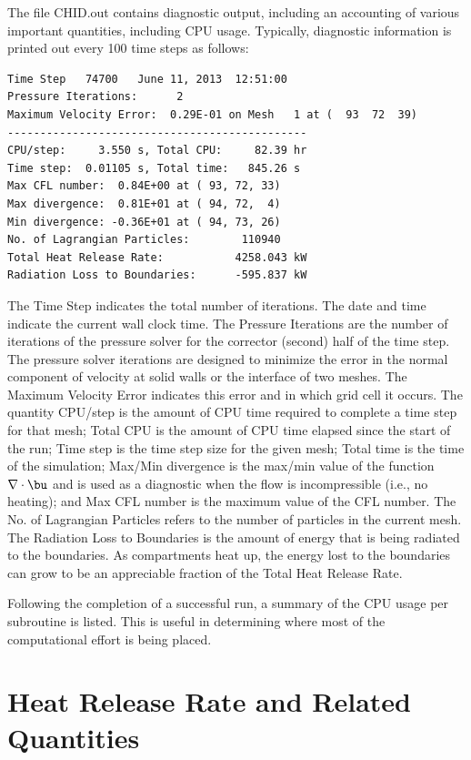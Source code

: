 \documentclass[11pt]{book}
\begin{document}
The file {\ct CHID.out} contains diagnostic output, including an accounting of various important quantities, including CPU usage. Typically, diagnostic information is printed out every 100 time steps as follows:
\begin{lstlisting}
Time Step   74700   June 11, 2013  12:51:00
Pressure Iterations:      2
Maximum Velocity Error:  0.29E-01 on Mesh   1 at (  93  72  39)
----------------------------------------------
CPU/step:     3.550 s, Total CPU:     82.39 hr
Time step:  0.01105 s, Total time:   845.26 s
Max CFL number:  0.84E+00 at ( 93, 72, 33)
Max divergence:  0.81E+01 at ( 94, 72,  4)
Min divergence: -0.36E+01 at ( 94, 73, 26)
No. of Lagrangian Particles:        110940
Total Heat Release Rate:           4258.043 kW
Radiation Loss to Boundaries:      -595.837 kW
\end{lstlisting}
The {\ct Time Step} indicates the total number of iterations. The date and time indicate the current wall clock time. The {\ct Pressure Iterations} are the number of iterations of the pressure solver for the corrector (second) half of the time step. The pressure solver iterations are designed to minimize the error in the normal component of velocity at solid walls or the interface of two meshes. The {\ct Maximum Velocity Error} indicates this error and in which grid cell it occurs. The quantity {\ct CPU/step} is the amount of CPU time required to complete a time step for that mesh; {\ct Total CPU} is the amount of CPU time elapsed since the start of the run; {\ct Time step} is the time step size for the given mesh; {\ct Total time} is the time of the simulation; {\ct Max/Min divergence} is the max/min value of the function $\nabla \cdot \bu$ and is used as a diagnostic when the flow is incompressible (i.e., no heating); and {\ct Max CFL number} is the maximum value of the CFL number. The {\ct No. of Lagrangian Particles} refers to the number of particles in the current mesh. The {\ct Radiation Loss to Boundaries} is the amount of energy that is being radiated to the boundaries. As compartments heat up, the energy lost to the boundaries can grow to be an appreciable fraction of the {\ct Total Heat Release Rate}.

Following the completion of a successful run, a summary of the CPU
usage per subroutine is listed. This is useful in determining where
most of the computational effort is being placed.

\section{Heat Release Rate and Related Quantities}
\end{document}
